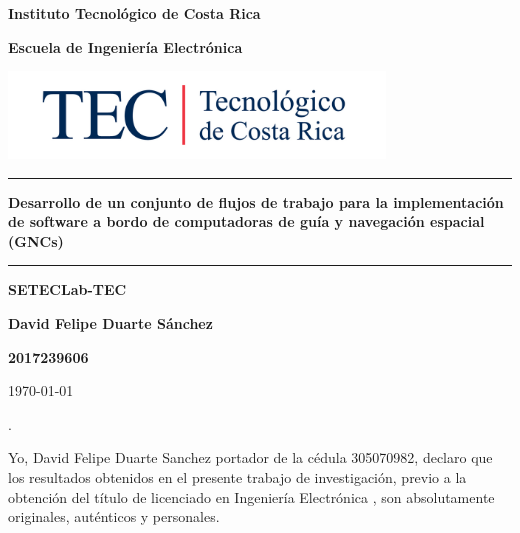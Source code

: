\documentclass[12pt]{article}
\begin{document}
\begin{titlepage}

  \centering


  \vspace{10cm}

  \textbf{\LARGE Instituto Tecnológico de Costa Rica}

  \vspace{2cm}

  \textbf{\LARGE Escuela de Ingeniería Electrónica}

  \vspace{2cm}

  \includegraphics[width=10cm]{logotec/image.png}
  \vspace{2cm}

  \hrule

  \vspace{1cm}

  \textbf{\LARGE Desarrollo de un conjunto de flujos de trabajo para la implementación de software a bordo de computadoras de guía y navegación espacial (GNCs)}

  \vspace{1cm}

  \hrule

  \vspace{1cm}

  \textbf{\LARGE SETECLab-TEC}

  \vspace{1cm}

  \textbf{\LARGE David Felipe Duarte Sánchez}

  \vspace{1cm}

  \textbf{\LARGE 2017239606}

  \vspace{1cm}

  \today %

\end{titlepage}
.
\par
\vspace{16cm} %

Yo, David Felipe Duarte Sanchez portador de la cédula 305070982, declaro que los resultados obtenidos en el presente trabajo de investigación, previo a la obtención del título de licenciado en Ingeniería Electrónica , son absolutamente originales, auténticos y personales.
\end{document}
